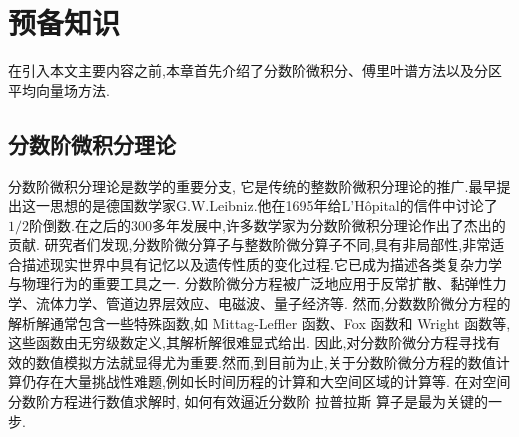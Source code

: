 \chapter[预备知识]{预备知识}

在引入本文主要内容之前,本章首先介绍了分数阶微积分、傅里叶谱方法以及分区平均向量场方法.
\section{分数阶微积分理论}
分数阶微积分理论是数学的重要分支, 它是传统的整数阶微积分理论的推广.最早提出这一思想的是德国数学家G.W.Leibniz.他在1695年给L'Hôpital的信件中讨论了$1/2$阶倒数.在之后的300多年发展中,许多数学家为分数阶微积分理论作出了杰出的贡献\cite{SunZhiZhongFenShuJieWeiFenFangChengDeYouXianChaiFenFangFa2021}.
研究者们发现,分数阶微分算子与整数阶微分算子不同,具有非局部性,非常适合描述现实世界中具有记忆以及遗传性质的变化过程.它已成为描述各类复杂力学与物理行为的重要工具之一.
分数阶微分方程被广泛地应用于反常扩散、黏弹性力学、流体力学、管道边界层效应、电磁波、量子经济等.
然而,分数数阶微分方程的解析解通常包含一些特殊函数,如 Mittag-Leffler 函数、Fox 函数和 Wright 函数等,这些函数由无穷级数定义,其解析解很难显式给出.
因此,对分数阶微分方程寻找有效的数值模拟方法就显得尤为重要.然而,到目前为止,关于分数阶微分方程的数值计算仍存在大量挑战性难题,例如长时间历程的计算和大空间区域的计算等.
在对空间分数阶方程进行数值求解时, 如何有效逼近分数阶 拉普拉斯 算子是最为关键的一步. 
